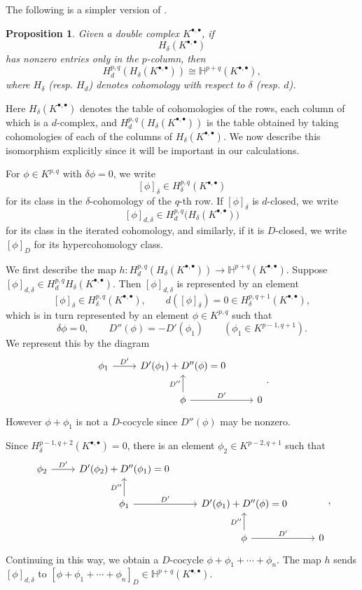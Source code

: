 \documentclass[dvipsnames,11pt]{article}
\newtheorem{proposition}[theorem]{Proposition}
\theoremstyle{definition}
\begin{document}
\begin{appendices}
The following is a simpler version of \cite[Proposition~12.1]{BT}.

\begin{proposition}\label{prop:ttt}
Given a double complex $K^{\bullet,\bullet}$, if
\[
 H_\delta(K^{\bullet,\bullet})
\]
has nonzero entries only in the $p$-column, then 
\[
H_d^{p,q}( H_\delta(K^{\bullet,\bullet})) \cong \mathbb H^{p+q}(K^{\bullet,\bullet}),
\]
where $H_\delta$ (resp. $H_d$) denotes cohomology with respect to $\delta$ (resp. $d$).
\end{proposition}

Here $H_\delta(K^{\bullet,\bullet})$ denotes the table of cohomologies of the rows, each column of which is a $d$-complex, and $H_d^{p,q}( H_\delta(K^{\bullet,\bullet}))$ is the table obtained by taking cohomologies of each of the columns of $H_\delta(K^{\bullet,\bullet})$. We now describe this isomorphism explicitly since it will be important in our calculations.

For $\phi \in K^{p,q}$ with $\delta \phi = 0$, we write
\[
[\phi]_\delta \in H_\delta^{p,q}(K^{\bullet,\bullet})
\]
for its class in the $\delta$-cohomology of the $q$-th row. If $[\phi]_\delta$ is $d$-closed, we write
\[
[\phi]_{d,\delta} \in H_d^{p,q}\bigl(H_\delta(K^{\bullet,\bullet})\bigr)
\]
for its class in the iterated cohomology, and similarly, if it is $D$-closed, we write $[\phi]_D$ for its hypercohomology class.

We first describe the map $h: H_d^{p,q}( H_\delta(K^{\bullet,\bullet})) \rightarrow \mathbb H^{p+q}(K^{\bullet,\bullet})$. Suppose $[\phi]_{d,\delta} \in H_d^{p,q}H_\delta(K^{\bullet,\bullet})$. Then $[\phi]_{d,\delta}$ is represented by an element 
\[
[\phi]_{\delta} \in H_\delta^{p,q}(K^{\bullet,\bullet}), \qquad d([\phi]_{\delta})=0 \in H_\delta^{p,q+1}(K^{\bullet,\bullet}),
\]
which is in turn represented by an element $\phi \in K^{p,q}$ such that 
\[
\delta \phi = 0, \qquad D''(\phi) = - D'(\phi_1) \qquad (\phi_1 \in K^{p-1,q+1}).
\]
We represent this by the diagram
\[
\begin{tikzcd}
\phi_1 \arrow[r,"{D'}"] &  D'(\phi_1)+D''(\phi) =0 & \\
& \phi \arrow[u,"{D''}"] \arrow[r,"{D'}"] & 0
\end{tikzcd}.
\]
However $\phi+\phi_1$ is not a $D$-cocycle since $D''(\phi)$ may be nonzero. 

Since $H_\delta^{p-1,q+2}(K^{\bullet,\bullet}) = 0$, there is an element $\phi_2 \in K^{p-2,q+1}$ such that
\[
\begin{tikzcd}
\phi_2 \arrow[r,"{D'}"] &  D'(\phi_2)+D''(\phi_1) =0 && \\
&\phi_1 \arrow[r,"{D'}"] \arrow[u,"{D''}"] &  D'(\phi_1)+D''(\phi) =0 & \\
&& \phi \arrow[u,"{D''}"] \arrow[r,"{D'}"] & 0
\end{tikzcd},
\]
Continuing in this way, we obtain a $D$-cocycle $\phi + \phi_1 + \cdots + \phi_n$. The map $h$ sends $[\phi]_{d,\delta}$ to $[\phi+ \phi_1 + \cdots + \phi_n]_D \in  \mathbb H^{p+q}(K^{\bullet,\bullet})$.


\end{appendices}
\end{document}
